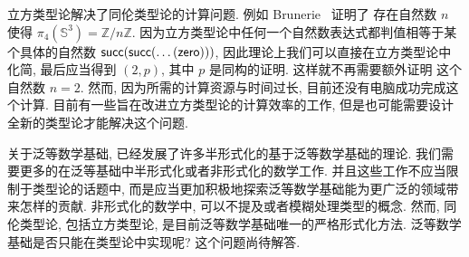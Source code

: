 立方类型论解决了同伦类型论的计算问题.
例如 Brunerie~\cite{brunerie:2016:number} 证明了
存在自然数 \(n\) 使得 \(\pi_4(\mathbb S^3) = \mathbb Z/n\mathbb Z\).
因为立方类型论中任何一个自然数表达式都判值相等于某个具体的自然数
\(\textnormal{\textsf{succ}}(\textnormal{\textsf{succ}}(\dots (\textnormal{\textsf{zero}})))\),
因此理论上我们可以直接在立方类型论中化简, 最后应当得到
\((2, p)\), 其中 \(p\) 是同构的证明. 这样就不再需要额外证明
这个自然数 \(n = 2\). 然而, 因为所需的计算资源与时间过长,
目前还没有电脑成功完成这个计算.
目前有一些旨在改进立方类型论的计算效率的工作,
但是也可能需要设计全新的类型论才能解决这个问题.

关于泛等数学基础, \cite{ufp:2013:hottbook}
已经发展了许多半形式化的基于泛等数学基础的理论.
我们需要更多的在泛等基础中半形式化或者非形式化的数学工作.
并且这些工作不应当限制于类型论的话题中,
而是应当更加积极地探索泛等数学基础能为更广泛的领域带来怎样的贡献.
非形式化的数学中, 可以不提及或者模糊处理类型的概念.
然而, 同伦类型论, 包括立方类型论,
是目前泛等数学基础唯一的严格形式化方法.
泛等数学基础是否只能在类型论中实现呢? 这个问题尚待解答.

